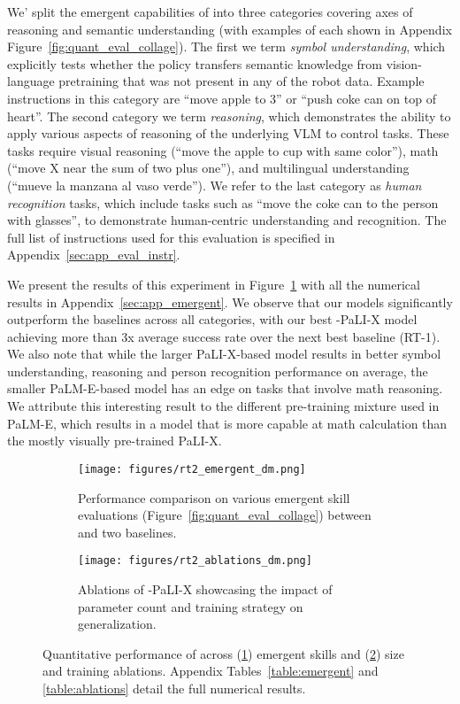 We' split the emergent capabilities of \methodname into three categories covering axes of reasoning and semantic understanding (with examples of each shown in  Appendix Figure~\ref{fig:quant_eval_collage}). 
The first we term \textit{symbol understanding}, which explicitly tests whether the \methodname policy transfers semantic knowledge from vision-language pretraining that was not present in any of the robot data. Example instructions in this category are ``move apple to 3'' or ``push coke can on top of heart''. 
The second category we term \textit{reasoning}, which  demonstrates the ability to apply various aspects of reasoning of the underlying VLM to control tasks.
These tasks require visual reasoning (``move the apple to cup with same color''), math (``move X near the sum of two plus one''), and multilingual understanding (``mueve la manzana al vaso verde'').
We refer to the last category as \textit{human recognition} tasks, which include tasks such as ``move the coke can to the person with glasses'', to demonstrate human-centric understanding and recognition.
The full list of instructions used for this evaluation is specified in Appendix~\ref{sec:app_eval_instr}.

We present the results of this experiment in Figure~\ref{fig:emergent} with all the numerical results in Appendix~\ref{sec:app_emergent}. We observe that our \categoryname models significantly outperform the baselines across all categories, with our best \methodname-PaLI-X model achieving more than 3x average success rate over the next best baseline (RT-1). We also note that while the larger PaLI-X-based model results in better symbol understanding, reasoning and person recognition performance on average, the smaller PaLM-E-based model has an edge on tasks that involve math reasoning. We attribute this interesting result to the different pre-training mixture used in PaLM-E, which results in a model that is more capable at math calculation than the mostly visually pre-trained PaLI-X. 

\begin{figure}[h]
\centering
    \begin{subfigure}[b]{0.49\textwidth}
    \centering
    \texttt{[image: figures/rt2\_emergent\_dm.png]}
\caption{Performance comparison on various emergent skill evaluations (Figure~\ref{fig:quant_eval_collage}) between \methodname and two baselines.}
\label{fig:emergent}
\end{subfigure}
\begin{subfigure}[b]{0.49\textwidth}
\centering
    \texttt{[image: figures/rt2\_ablations\_dm.png]}
    \caption{Ablations of \methodname-PaLI-X showcasing the impact of parameter count and training strategy on generalization.}
    \label{fig:ablations}
    \end{subfigure}
\caption{Quantitative performance of \methodname across (\ref{fig:emergent}) emergent skills and (\ref{fig:ablations}) size and training ablations. Appendix Tables~\ref{table:emergent} and \ref{table:ablations} detail the full numerical results.}
\label{fig:quant}
\end{figure}

